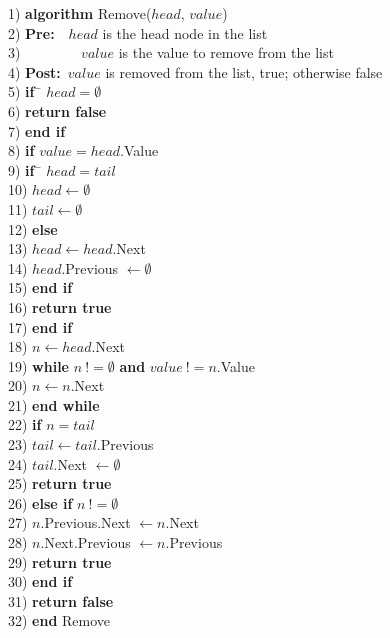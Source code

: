 \newpage
\begin{tabbing}
1)  \textbf{alg}\= \textbf{orithm} Remove($head$, $value$) \\
2)  \> \textbf{Pre:}~~$head$ is the head node in the list \\
3)  \> ~~~~~~~~$value$ is the value to remove from the list \\
4)  \> \textbf{Post:}~$value$ is removed from the list, true; otherwise false \\
5)  \> \textbf{if}~\= $head = \emptyset$ \\
6)  \> \> \textbf{return false} \\
7)  \> \textbf{end if} \\
8)  \> \textbf{if} $value = head$.Value \\
9)  \> \> \textbf{if}~\= $head = tail$ \\
10) \> \> \> $head \leftarrow \emptyset$ \\
11) \> \> \> $tail \leftarrow \emptyset$ \\
12) \> \> \textbf{else} \\
13) \> \> \> $head \leftarrow head$.Next \\
14) \> \> \> $head$.Previous $\leftarrow \emptyset$ \\
15) \> \> \textbf{end if} \\
16) \> \> \textbf{return true} \\
17) \> \textbf{end if} \\
18) \> $n \leftarrow head$.Next \\
19) \> \textbf{while} $n~!= \emptyset$ \textbf{and} $value~!= n$.Value \\
20) \> \> $n \leftarrow n$.Next \\
21) \> \textbf{end while} \\
22) \> \textbf{if} $n = tail$ \\
23) \> \> $tail \leftarrow tail$.Previous \\
24) \> \> $tail$.Next $\leftarrow \emptyset$ \\
25) \> \> \textbf{return true} \\
26) \> \textbf{else if} $n~!= \emptyset$ \\
27) \> \> $n$.Previous.Next $\leftarrow n$.Next \\
28) \> \> $n$.Next.Previous $\leftarrow n$.Previous \\
29) \> \> \textbf{return true} \\
30) \> \textbf{end if} \\
31) \> \textbf{return false} \\
32) \textbf{end} Remove \\
\end{tabbing}
